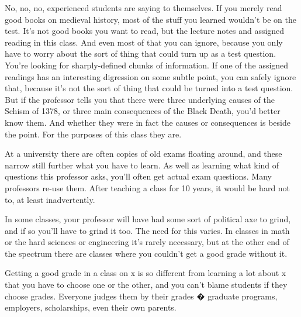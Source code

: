 No,
                  no, no, experienced students are saying to themselves. If you
                  merely read good books on medieval history, most of the stuff
                  you learned wouldn't be on the test. It's not good books you
                  want to read, but the lecture notes and assigned reading in
                  this class. And even most of that you can ignore, because you
                  only have to worry about the sort of thing that could turn up
                  as a test question. You're looking for sharply-defined chunks
                  of information. If one of the assigned readings has an
                  interesting digression on some subtle point, you can safely
                  ignore that, because it's not the sort of thing that could be
                  turned into a test question. But if the professor tells you
                  that there were three underlying causes of the Schism of 1378,
                  or three main consequences of the Black Death, you'd better
                  know them. And whether they were in fact the causes or
                  consequences is beside the point. For the purposes of this
                  class they are.

At a university there are often
                  copies of old exams floating around, and these narrow still
                  further what you have to learn. As well as learning what kind
                  of questions this professor asks, you'll often get actual exam
                  questions. Many professors re-use them. After teaching a class
                  for 10 years, it would be hard not to, at least
                  inadvertently.

In some classes, your professor will
                  have had some sort of political axe to grind, and if so you'll
                  have to grind it too. The need for this varies. In classes in
                  math or the hard sciences or engineering it's rarely
                  necessary, but at the other end of the spectrum there are
                  classes where you couldn't get a good grade without it.

Getting
                  a good grade in a class on x is so different from learning a
                  lot about x that you have to choose one or the other, and you
                  can't blame students if they choose grades. Everyone judges
                  them by their grades � graduate programs, employers,
                  scholarships, even their own parents.


